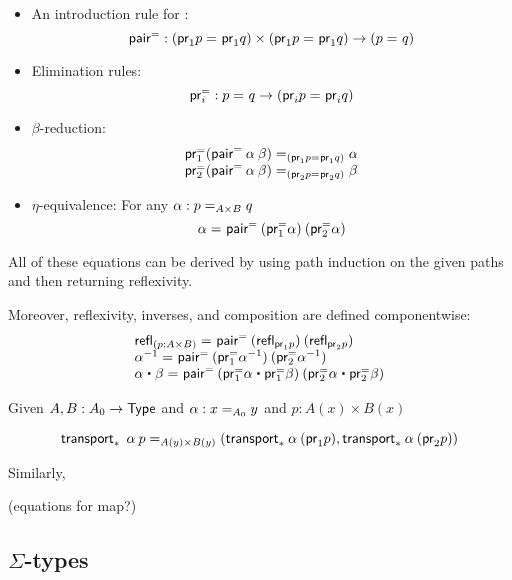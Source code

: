 \begin{itemize}
\item An introduction rule for :
  \[
  \pairpath : (\id{\proj{1} p}{\proj{1} q}) \times (\id{\proj{1} p}{\proj{1} q}) \to {(\id p q)}
  \]
\item Elimination rules:
  \[
  \projpath{i} : \id{p}{q} \to (\id{\proj{i} p}{\proj{i} q})
  \]
\item $\beta$-reduction:
  \[
  \begin{array}{l}
  \id[(\id{\proj{1} p}{\proj{1} q})]
       {\projpath{1}{(\pairpath \: \alpha \: \beta})}
       {\alpha} \\
  \id[(\id{\proj{2} p}{\proj{2} q})]
       {\projpath{2}{(\pairpath \: \alpha \: \beta})}
       {\beta}
  \end{array}
  \]
\item $\eta$-equivalence: For any $\alpha : \id[A \times B] p q$
  \[
  \id{\alpha}{\pairpath \: (\projpath{1} \alpha) \: (\projpath{2} \alpha) }
  \]
\end{itemize}
All of these equations can be derived by using path induction on the given
paths and then returning reflexivity.  

Moreover, reflexivity, inverses, and composition are defined
componentwise:
\[
\begin{array}{l}
\id {\refl{(p : A \times B)}} {\pairpath \: (\refl{\proj{1} p}) \: (\refl{\proj{2} p})} \\
\id {\opp{\alpha}} {\pairpath \: (\opp{\projpath{1} \alpha}) \: (\opp{\projpath{2} \alpha})}  \\
\id {{\alpha \ct \beta}} {\pairpath \: 
  ({\projpath{1} \alpha} \ct
   {\projpath{1} \beta})
   \: 
   ({\projpath{2} \alpha} \ct {\projpath{2} \beta})}
\end{array}
\]

Given $ A, B : A_0 \to \type$ and $\alpha : \id[A_0]{x}{y}$ 
and $p : A(x) \times B(x)$

\[
\id[A(y) \times B(y)]{\transport{x_0:A_0 \mapsto A(x_0) \times B(x_0)}
  \: \alpha \: {p}}
   {(\transport{x_0 \mapsto A(x_0)} \alpha \: (\proj{1} p), 
       \transport{x_0 \mapsto B(x_0)} \alpha \: (\proj{2} p))}
\]

Similarly, 

(equations for map?)

\subsection{$\Sigma$-types}

